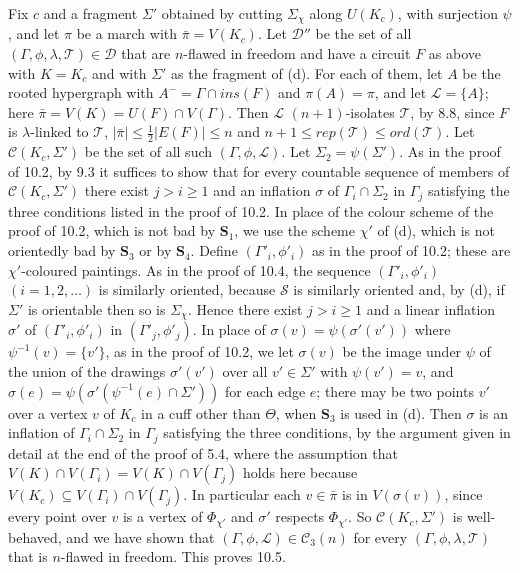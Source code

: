 {Fix $c$ and a fragment $\Sigma'$ obtained by cutting $\Sigma_\chi$ along $U(K_c)$, with surjection $\psi$, and let $\pi$ be a march with $\bar{\pi} = V(K_c)$. Let $\mathscr{D}''$ be the set of all $(\Gamma, \phi, \lambda, \mathscr{T}) \in \mathscr{D}$ that are $n$-flawed in freedom and have a circuit $F$ as above with $K = K_c$ and with $\Sigma'$ as the fragment of (d). For each of them, let $A$ be the rooted hypergraph with $A^- = \Gamma \cap ins(F)$ and $\pi(A) = \pi$, and let $\mathscr{L} = \{A\}$; here $\bar{\pi} = V(K) = U(F) \cap V(\Gamma)$. Then $\mathscr{L}$ $(n+1)$-isolates $\mathscr{T}$, by 8.8, since $F$ is $\lambda$-linked to $\mathscr{T}$, $|\bar{\pi}| \le \frac{1}{2}|E(F)| \le n$ and $n + 1 \le rep(\mathscr{T}) \le ord(\mathscr{T})$. Let $\mathscr{C}(K_c, \Sigma')$ be the set of all such $(\Gamma, \phi, \mathscr{L})$. Let $\Sigma_2 = \psi(\Sigma')$. As in the proof of 10.2, by 9.3 it suffices to show that for every countable sequence of members of $\mathscr{C}(K_c, \Sigma')$ there exist $j > i \ge 1$ and an inflation $\sigma$ of $\Gamma_i \cap \Sigma_2$ in $\Gamma_j$ satisfying the three conditions listed in the proof of 10.2. In place of the colour scheme of the proof of 10.2, which is not bad by $\mathbf{S}_1$, we use the scheme $\chi'$ of (d), which is not orientedly bad by $\mathbf{S}_3$ or by $\mathbf{S}_4$. Define $(\Gamma'_i, \phi'_i)$ as in the proof of 10.2; these are $\chi'$-coloured paintings. As in the proof of 10.4, the sequence $(\Gamma'_i, \phi'_i)$ $(i = 1, 2, \dots)$ is similarly oriented, because $\mathscr{S}$ is similarly oriented and, by (d), if $\Sigma'$ is orientable then so is $\Sigma_\chi$. Hence there exist $j > i \ge 1$ and a linear inflation $\sigma'$ of $(\Gamma'_i, \phi'_i)$ in $(\Gamma'_j, \phi'_j)$. In place of $\sigma(v) = \psi(\sigma'(v'))$ where $\psi^{-1}(v) = \{v'\}$, as in the proof of 10.2, we let $\sigma(v)$ be the image under $\psi$ of the union of the drawings $\sigma'(v')$ over all $v' \in \Sigma'$ with $\psi(v') = v$, and $\sigma(e) = \psi(\sigma'(\psi^{-1}(e) \cap \Sigma'))$ for each edge $e$; there may be two points $v'$ over a vertex $v$ of $K_c$ in a cuff other than $\Theta$, when $\mathbf{S}_3$ is used in (d). Then $\sigma$ is an inflation of $\Gamma_i \cap \Sigma_2$ in $\Gamma_j$ satisfying the three conditions, by the argument given in detail at the end of the proof of 5.4, where the assumption that $V(K) \cap V(\Gamma_i) = V(K) \cap V(\Gamma_j)$ holds here because $V(K_c) \subseteq V(\Gamma_i) \cap V(\Gamma_j)$. In particular each $v \in \bar{\pi}$ is in $V(\sigma(v))$, since every point over $v$ is a vertex of $\Phi_{\chi'}$ and $\sigma'$ respects $\Phi_{\chi'}$. So $\mathscr{C}(K_c, \Sigma')$ is well-behaved, and we have shown that $(\Gamma, \phi, \mathscr{L}) \in \mathscr{C}_3(n)$ for every $(\Gamma, \phi, \lambda, \mathscr{T})$ that is $n$-flawed in freedom. This proves 10.5.}

